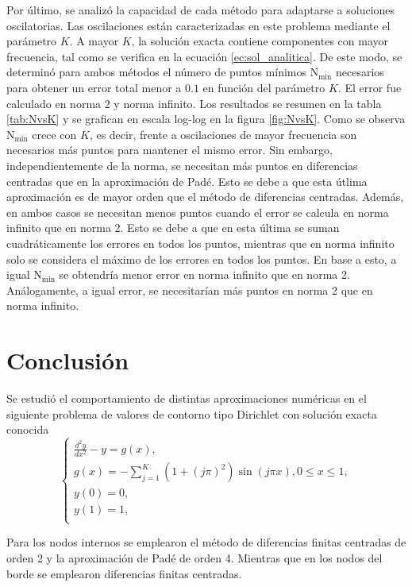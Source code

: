 \documentclass[aps,prb,twocolumn,superscriptaddress,floatfix,longbibliography]{revtex4-2}
\newcounter{para}
\begin{document}
Por último, se analizó la capacidad de cada método para adaptarse a soluciones oscilatorias. Las oscilaciones están caracterizadas en este problema mediante el parámetro $K$. A mayor $K$, la solución exacta contiene componentes con mayor frecuencia, tal como se verifica en la ecuación \ref{ec:sol_analitica}. De este modo, se determinó para ambos métodos el número de puntos mínimos $\mathrm{N_{min}}$ necesarios para obtener un error total menor a $0.1$ en función del parámetro $K$. El error fue calculado en norma 2 y norma infinito. Los resultados se resumen en la tabla \ref{tab:NvsK} y se grafican en escala log-log en la figura \ref{fig:NvsK}. Como se observa $\mathrm{N_{min}}$ crece con $K$, es decir, frente a oscilaciones de mayor frecuencia son necesarios más puntos para mantener el mismo error. Sin embargo, independientemente de la norma, se necesitan más puntos en diferencias centradas que en la aproximación de Padé. Esto se debe a que esta útlima aproximación es de mayor orden que el método de diferencias centradas. Además, en ambos casos se necesitan menos puntos cuando el error se calcula en norma infinito que en norma 2. Esto se debe a que en esta última se suman cuadráticamente los errores en todos los puntos, mientras que en norma infinito solo se considera el máximo de los errores en todos los puntos. En base a esto, a igual $\mathrm{N_{min}}$ se obtendría menor error en norma infinito que en norma 2. Análogamente, a igual error, se necesitarían más puntos en norma 2 que en norma infinito.

\section{Conclusión}

Se estudió el comportamiento de distintas aproximaciones numéricas en el siguiente problema de valores de contorno tipo Dirichlet con solución exacta conocida
\begin{equation}
    \left\{\begin{matrix}
        \frac{d^2 y}{dx^2} - y = g(x), \\ 
        g (x) = - \sum_{j = 1}^K (1 + (j \pi)^2)\sin{(j \pi x)}, 0 \leq x \leq 1,\\
        y(0) = 0,\\
        y(1) = 1, \\
        \end{matrix}\right.
\end{equation}

Para los nodos internos se emplearon el método de diferencias finitas centradas de orden 2 y la aproximación de Padé de orden 4. Mientras que en los nodos del borde se emplearon diferencias finitas centradas.
\end{document}
